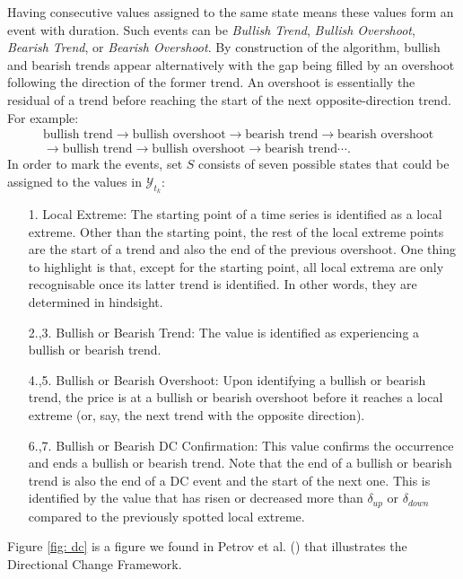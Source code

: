 Having consecutive values assigned to the same state means these values form an event with duration. Such events can be \textit{Bullish Trend}, \textit{Bullish Overshoot}, \textit{Bearish Trend}, or \textit{Bearish Overshoot}. By construction of the algorithm, bullish and bearish trends appear alternatively with the gap being filled by an overshoot following the direction of the former trend. An overshoot is essentially the residual of a trend before reaching the start of the next opposite-direction trend. For example:
\begin{align*}
    &\text{bullish trend} \rightarrow \text{bullish overshoot} \rightarrow \text{bearish trend} \rightarrow \text{bearish overshoot} \\
    & \rightarrow \text{bullish trend} \rightarrow \text{bullish overshoot} \rightarrow \text{bearish trend} \cdots.
\end{align*}
In order to mark the events, set $S$ consists of seven possible states that could be assigned to the values in $\mathcal{Y}_{t_k}$:
\begin{enumerate}
    \item[1.] Local Extreme: The starting point of a time series is identified as a local extreme. Other than the starting point, the rest of the local extreme points are the start of a trend and also the end of the previous overshoot. One thing to highlight is that, except for the starting point, all local extrema are only recognisable once its latter trend is identified. In other words, they are determined in hindsight.
    \item[2.,3.] Bullish or Bearish Trend: The value is identified as experiencing a bullish or bearish trend.
    \item[4.,5.] Bullish or Bearish Overshoot: Upon identifying a bullish or bearish trend, the price is at a bullish or bearish overshoot before it reaches a local extreme (or, say, the next trend with the opposite direction).
    \item[6.,7.] Bullish or Bearish DC Confirmation: This value confirms the occurrence and ends a bullish or bearish trend. Note that the end of a bullish or bearish trend is also the end of a DC event and the start of the next one. This is identified by the value that has risen or decreased more than $\delta_{up}$ or $\delta_{down}$ compared to the previously spotted local extreme.
\end{enumerate}
Figure \ref{fig: dc} is a figure we found in Petrov et al. (\citeyear{petrov2018agent}) that illustrates the Directional Change Framework.
